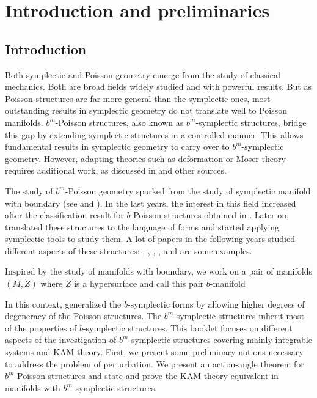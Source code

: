 \part{Introduction and preliminaries}
\chapter{Introduction}
\label{ch:introduction}

Both symplectic and Poisson geometry emerge from the study of classical mechanics. Both are broad fields widely studied and with powerful results. But as Poisson structures are far more general than the symplectic ones, most outstanding results in symplectic geometry do not translate well to Poisson manifolds. $b^m$-Poisson structures, also known as $b^m$-symplectic structures, bridge this gap by extending symplectic structures in a controlled manner. This allows fundamental results in symplectic geometry to carry over to $b^m$-symplectic geometry. However, adapting theories such as deformation or Moser theory requires additional work, as discussed in \cite{GMPS} and other sources.


The study of $b^m$-Poisson geometry sparked from the study of symplectic manifold with boundary (see \cite{Melrose93} and \cite{NT96}). In the last years, the interest in this field increased after the classification result for $b$-Poisson structures obtained in \cite{Radko02}. Later on, \cite{GMP14} translated these structures to the language of forms and started applying symplectic tools to study them. A lot of papers in the following years studied different aspects of these structures: \cite{GMP10}, \cite{GMP14}, \cite{GMP15}, \cite{GMW17}, \cite{MO2} and  \cite{GUAL14} are some examples.

Inspired by the study of manifolds with boundary, we work on a pair of manifolds $(M,Z)$ where $Z$ is a hypersurface and call this pair $b$-manifold

In this context, \cite{Scott16} generalized the $b$-symplectic forms by allowing higher degrees of degeneracy of the Poisson structures. The $b^m$-symplectic structures inherit most of the properties of $b$-symplectic structures. This booklet focuses on  different aspects of the investigation of $b^m$-symplectic structures covering mainly integrable systems and KAM theory. First, we present some preliminary notions necessary to address the problem of perturbation.  We present an action-angle theorem for $b^m$-Poisson structures and state and prove the KAM theory equivalent in manifolds with $b^m$-symplectic structures. 


